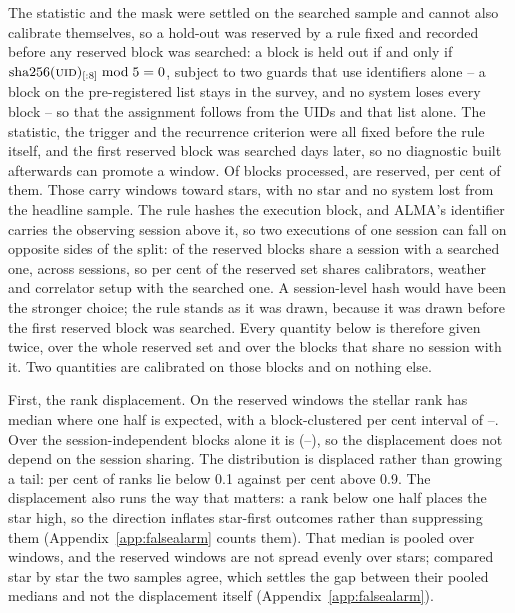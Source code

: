 The statistic and the mask were settled on the searched sample and cannot also
calibrate themselves, so a hold-out was reserved by a rule fixed and recorded
before any reserved block was searched: a block is held out if and only if
$\mathrm{sha256}(\textsc{uid})_{[:8]} \bmod 5 = 0$, subject to two guards that
use identifiers alone -- a block on the pre-registered list stays in the
survey, and no system loses every block -- so that the assignment follows
from the UIDs and that list alone. The statistic, the trigger and the
recurrence criterion were all fixed before the rule itself, and the first
reserved block was searched \HoLeadBlockDays{} days later, so no diagnostic
built afterwards can promote a window. Of
\NEbProcessedAll{} blocks processed, \NEbHeldOut{} are reserved, \HoPctHeld{}
per cent of them. Those carry \HoWin{} windows toward \HoStars{} stars, with
no star and no system lost from the headline sample. The rule hashes the
execution block, and ALMA's
identifier carries the observing session above it, so two executions of one session can fall on opposite sides of the split:
\BkSessHoBlocks{} of the
\NEbHeldOut{} reserved blocks share a session with a searched one, across
\BkSessShared{} sessions, so \HsSharePct{} per cent of the reserved set shares
calibrators, weather and correlator setup with the searched one. A
session-level hash would have been the stronger choice; the rule stands as it
was drawn, because it was drawn before the first reserved block was searched.
Every quantity below is therefore given twice, over the whole reserved set and
over the \HsIndBlocks{} blocks that share no session with it. Two quantities
are calibrated on those blocks and on nothing else.

First, the rank displacement. On the reserved windows the stellar rank has
median \HoRankMed{} where one half is expected, with a block-clustered
\CeCovPct{} per cent interval of \HoRankMedLo--\HoRankMedHi. Over the
session-independent blocks alone it is \HsIndRankMed{}
(\HsIndRankLo--\HsIndRankHi), so the displacement does not depend on the
session sharing. The distribution is displaced rather
than growing a tail: \HOFracLoPct{} per cent of ranks lie below 0.1 against
\HOFracHiPct{} per cent above 0.9. The displacement also runs the way that
matters: a rank below one half places the star high, so the direction
inflates star-first outcomes rather than suppressing them
(Appendix~\ref{app:falsealarm} counts them).
That median is pooled over windows, and the reserved windows are not spread
evenly over stars; compared star by star the two samples agree, which settles
the gap between their pooled medians and not the displacement itself
(Appendix~\ref{app:falsealarm}).

